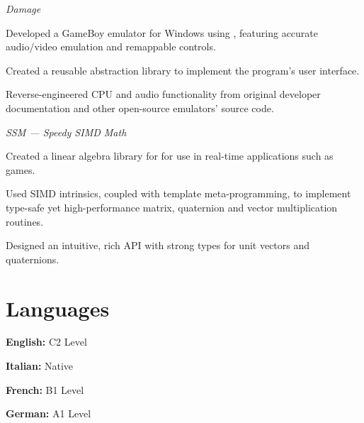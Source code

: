 \begin{cventries}
  {\textit{Damage}}
  {}
  {}
  {%
    \begin{cvitems}
    \item Developed a GameBoy emulator for Windows using , featuring accurate audio/video emulation and remappable controls.\textbf{}
    \item Created a reusable  abstraction library to implement the program's user interface.
    \item Reverse-engineered CPU and audio functionality from original developer documentation and other open-source emulators' source code.
    \end{cvitems}
  }
  {\textit{SSM --- Speedy SIMD Math}}
  {}
  {}
  {%
    \begin{cvitems}
    \item Created a linear algebra library for  for use in real-time applications such as games.\textbf{}
    \item Used SIMD intrinsics, coupled with template meta-programming, to implement type-safe yet high-performance matrix, quaternion and vector multiplication routines.
    \item Designed an intuitive, rich API with strong types for unit vectors and quaternions.
    \end{cvitems}
  }
\end{cventries}

\section*{Languages}
\begin{cvitems}
\item \textbf{English: } C2 Level
\item \textbf{Italian: } Native
\item \textbf{French: } B1 Level
\item \textbf{German: } A1 Level
\end{cvitems}

